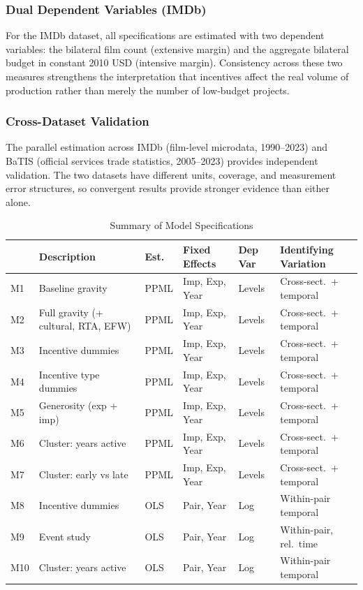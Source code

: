 \subsubsection{Dual Dependent Variables (IMDb)}

For the IMDb dataset, all specifications are estimated with two dependent variables: the bilateral film count (extensive margin) and the aggregate bilateral budget in constant 2010 USD (intensive margin). Consistency across these two measures strengthens the interpretation that incentives affect the real volume of production rather than merely the number of low-budget projects.

\subsubsection{Cross-Dataset Validation}

The parallel estimation across IMDb (film-level microdata, 1990--2023) and BaTIS (official services trade statistics, 2005--2023) provides independent validation. The two datasets have different units, coverage, and measurement error structures, so convergent results provide stronger evidence than either alone.

\begin{table}[H]
\centering
\caption{Summary of Model Specifications}
\label{tab:model_summary}
\small
\begin{tabular}{@{}llllll@{}}
\toprule
& Description & Est. & Fixed Effects & Dep Var & Identifying Variation \\
\midrule
M1 & Baseline gravity & PPML & Imp, Exp, Year & Levels & Cross-sect.\ + temporal \\
M2 & Full gravity (+ cultural, RTA, EFW) & PPML & Imp, Exp, Year & Levels & Cross-sect.\ + temporal \\
M3 & Incentive dummies & PPML & Imp, Exp, Year & Levels & Cross-sect.\ + temporal \\
M4 & Incentive type dummies & PPML & Imp, Exp, Year & Levels & Cross-sect.\ + temporal \\
M5 & Generosity (exp + imp) & PPML & Imp, Exp, Year & Levels & Cross-sect.\ + temporal \\
M6 & Cluster: years active & PPML & Imp, Exp, Year & Levels & Cross-sect.\ + temporal \\
M7 & Cluster: early vs late & PPML & Imp, Exp, Year & Levels & Cross-sect.\ + temporal \\
M8 & Incentive dummies & OLS & Pair, Year & Log & Within-pair temporal \\
M9 & Event study & OLS & Pair, Year & Log & Within-pair, rel.\ time \\
M10 & Cluster: years active & OLS & Pair, Year & Log & Within-pair temporal \\
\bottomrule
\end{tabular}
\end{table}